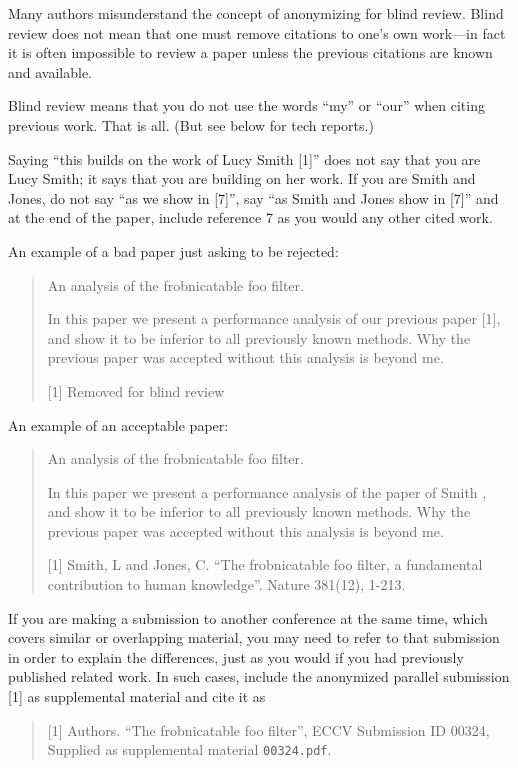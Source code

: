 \documentclass[runningheads]{llncs}
\begin{document}
Many authors misunderstand the concept of anonymizing for blind review.
Blind review does not mean that one must remove citations to one's own work---in fact it is often impossible to review a paper unless the previous citations are known and available.

Blind review means that you do not use the words ``my'' or ``our'' when citing previous work.
That is all.
(But see below for tech reports.)

Saying ``this builds on the work of Lucy Smith [1]'' does not say that you are Lucy Smith;
it says that you are building on her work.
If you are Smith and Jones, do not say ``as we show in [7]'', say ``as Smith and Jones show in [7]'' and at the end of the paper, include reference 7 as you would any other cited work.

An example of a bad paper just asking to be rejected:
\begin{quote}
  \begin{center}
      An analysis of the frobnicatable foo filter.
  \end{center}

   In this paper we present a performance analysis of our previous paper [1], and show it to be inferior to all previously known methods.
   Why the previous paper was accepted without this analysis is beyond me.

   [1] Removed for blind review
\end{quote}

An example of an acceptable paper:
\begin{quote}
  \begin{center}
     An analysis of the frobnicatable foo filter.
  \end{center}

   In this paper we present a performance analysis of the  paper of Smith \etal [1], and show it to be inferior to all previously known methods.
   Why the previous paper was accepted without this analysis is beyond me.

   [1] Smith, L and Jones, C. ``The frobnicatable foo filter, a fundamental contribution to human knowledge''. Nature 381(12), 1-213.
\end{quote}

If you are making a submission to another conference at the same time, which covers similar or overlapping material, you may need to refer to that submission in order to explain the differences, just as you would if you had previously published related work.
In such cases, include the anonymized parallel submission [1] as supplemental material and cite it as
\begin{quote}
  [1] Authors. ``The frobnicatable foo filter'', ECCV \ECCVyear Submission ID 00324, Supplied as supplemental material {\tt 00324.pdf}.
\end{quote}
\end{document}
